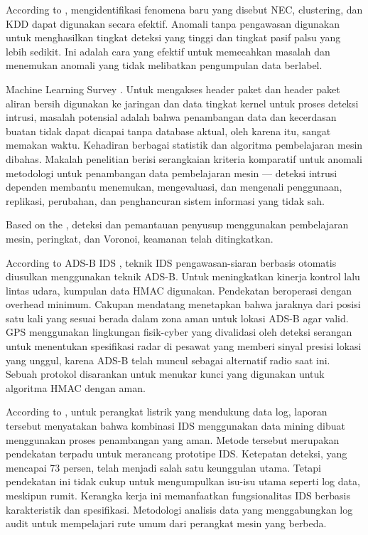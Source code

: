 \documentclass[conference]{IEEEtran}
\begin{document}
{According to \cite {chen2017novel}, mengidentifikasi fenomena baru yang disebut NEC, clustering, dan KDD dapat digunakan secara efektif. Anomali tanpa pengawasan digunakan untuk menghasilkan tingkat deteksi yang tinggi dan tingkat pasif palsu yang lebih sedikit. Ini adalah cara yang efektif untuk memecahkan masalah dan menemukan anomali yang tidak melibatkan pengumpulan data berlabel.

Machine Learning Survey \cite {buczak2015survey}. Untuk mengakses header paket dan header paket aliran bersih digunakan ke jaringan dan data tingkat kernel untuk proses deteksi intrusi, masalah potensial adalah bahwa penambangan data dan kecerdasan buatan tidak dapat dicapai tanpa database aktual, oleh karena itu, sangat memakan waktu. Kehadiran berbagai statistik dan algoritma pembelajaran mesin dibahas. Makalah penelitian berisi serangkaian kriteria komparatif untuk anomali metodologi untuk penambangan data pembelajaran mesin — deteksi intrusi dependen membantu menemukan, mengevaluasi, dan mengenali penggunaan, replikasi, perubahan, dan penghancuran sistem informasi yang tidak sah.

Based on the \cite {koli2017advanced}, deteksi dan pemantauan penyusup menggunakan pembelajaran mesin, peringkat, dan Voronoi, keamanan telah ditingkatkan.

According to ADS-B IDS \cite {kacem2016ads}, teknik IDS pengawasan-siaran berbasis otomatis diusulkan menggunakan teknik ADS-B. Untuk meningkatkan kinerja kontrol lalu lintas udara, kumpulan data HMAC digunakan. Pendekatan beroperasi dengan overhead minimum. Cakupan mendatang menetapkan bahwa jaraknya dari posisi satu kali yang sesuai berada dalam zona aman untuk lokasi ADS-B agar valid. GPS menggunakan lingkungan fisik-cyber yang divalidasi oleh deteksi serangan untuk menentukan spesifikasi radar di pesawat yang memberi sinyal presisi lokasi yang unggul, karena ADS-B telah muncul sebagai alternatif radio saat ini. Sebuah protokol disarankan untuk menukar kunci yang digunakan untuk algoritma HMAC dengan aman.

According to \cite {pan2015developing}, untuk perangkat listrik yang mendukung data log, laporan tersebut menyatakan bahwa kombinasi IDS menggunakan data mining dibuat menggunakan proses penambangan yang aman. Metode tersebut merupakan pendekatan terpadu untuk merancang prototipe IDS. Ketepatan deteksi, yang mencapai 73 persen, telah menjadi salah satu keunggulan utama. Tetapi pendekatan ini tidak cukup untuk mengumpulkan isu-isu utama seperti log data, meskipun rumit. Kerangka kerja ini memanfaatkan fungsionalitas IDS berbasis karakteristik dan spesifikasi. Metodologi analisis data yang menggabungkan log audit untuk mempelajari rute umum dari perangkat mesin yang berbeda.

}
\end{document}
